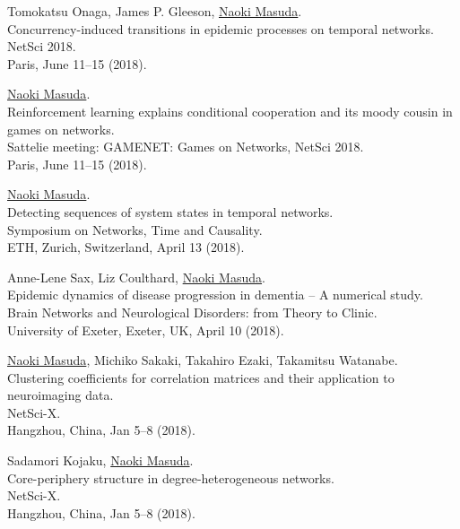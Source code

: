 \documentclass[11pt,letter]{article}
\begin{document}
\begin{etaremune}
\item Tomokatsu Onaga, James P. Gleeson, \underline{Naoki Masuda}.\\
Concurrency-induced transitions in epidemic processes on temporal networks.\\
NetSci 2018.\\
Paris, June 11--15 (2018).

\item \underline{Naoki Masuda}.\\
Reinforcement learning explains conditional cooperation and its moody cousin in games on networks.\\
Sattelie meeting: GAMENET: Games on Networks, NetSci 2018.\\
Paris, June 11--15 (2018).

\item \underline{Naoki Masuda}.\\
Detecting sequences of system states in temporal networks.\\
Symposium on Networks, Time and Causality.\\
ETH, Zurich, Switzerland, April 13 (2018).

\item Anne-Lene Sax, Liz Coulthard, \underline{Naoki Masuda}.\\
Epidemic dynamics of disease progression in dementia -- A numerical study.\\
Brain Networks and Neurological Disorders: from Theory to Clinic.\\
University of Exeter, Exeter, UK, April 10 (2018).

\item \underline{Naoki Masuda}, Michiko Sakaki, Takahiro Ezaki, Takamitsu Watanabe.\\
Clustering coefficients for correlation matrices and their application to neuroimaging data.\\
NetSci-X.\\
Hangzhou, China, Jan 5--8 (2018).

\item Sadamori Kojaku, \underline{Naoki Masuda}.\\
Core-periphery structure in degree-heterogeneous networks.\\
NetSci-X.\\
Hangzhou, China, Jan 5--8 (2018).


\end{etaremune}
\end{document}
